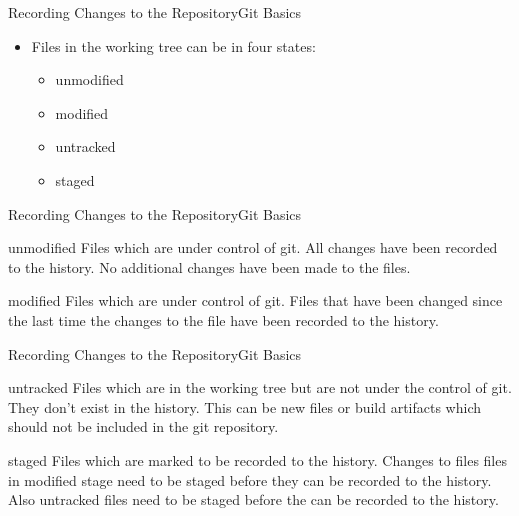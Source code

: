 \documentclass[aspectratio=169]{beamer}
\begin{document}
\begin{frame}{Recording Changes to the Repository}{Git Basics}
\begin{itemize}
    \item Files in the working tree can be in four states:
    \begin{itemize}
        \item unmodified
        \item modified
        \item untracked
        \item staged
    \end{itemize}
\end{itemize}
\end{frame}

\begin{frame}{Recording Changes to the Repository}{Git Basics}
\begin{block}{unmodified}
    Files which are under control of git. All changes have been recorded to the
    history. No additional changes have been made to the files.
\end{block}
\begin{block}{modified}
    Files which are under control of git. Files that have been changed since
    the last time the changes to the file have been recorded to the history.
\end{block}
\end{frame}


\begin{frame}{Recording Changes to the Repository}{Git Basics}
\begin{block}{untracked}
	Files which are in the working tree but are not under the control of git.
	They don't exist in the history. This can be new files or build artifacts
	which should not be included in the git repository.
\end{block}
\begin{block}{staged}
	Files which are marked to be recorded to the history. Changes to files files
	in modified stage need to be staged before they can be recorded to the
	history. Also untracked files need to be staged before the can be recorded to
	the history.
\end{block}
\end{frame}
\end{document}
